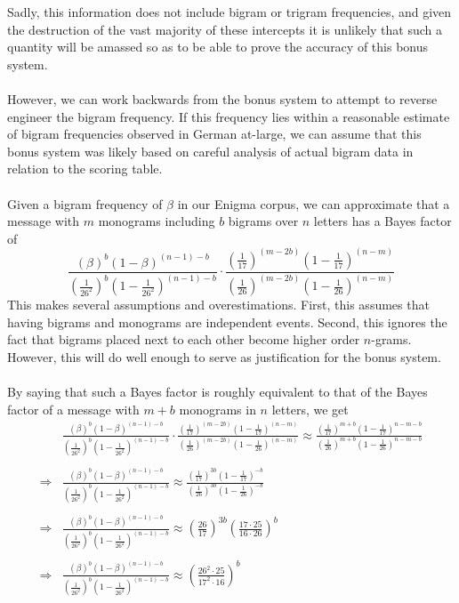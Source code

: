   Sadly, this information does not include bigram or trigram
  frequencies, and given the destruction of the vast majority of
  these intercepts it
  is unlikely that such a quantity will be amassed so as to be able
  to prove the accuracy of this bonus system.
  \\\\However, we can work backwards from the bonus system to attempt
  to reverse engineer the bigram frequency. If this frequency lies
  within a reasonable estimate of bigram frequencies observed in
  German at-large, we can assume that this bonus system was likely
  based on careful analysis of actual bigram data in relation to the
  scoring table.
  \\\\Given a bigram frequency of $\beta$ in our Enigma corpus, we
  can approximate that a message with $m$ monograms including $b$
  bigrams over $n$ letters has a Bayes factor of
  \[
    \frac{(\beta)^b(1-\beta)^{(n-1)-b}}{(\frac{1}{26^2})^b(1-\frac{1}{26^2})^{(n-1)-b}}\cdot\frac{(\frac{1}{17})^{(m-2b)}(1-\frac{1}{17})^{(n-m)}}{(\frac{1}{26})^{(m-2b)}(1-\frac{1}{26})^{(n-m)}}
  \]
  This makes several assumptions and overestimations. First, this
  assumes that having bigrams and monograms are independent events.
  Second, this ignores the fact that bigrams placed next to each
  other become higher order $n$-grams. However, this will do well
  enough to serve as justification for the bonus system.
  \\\\By saying that such a Bayes factor is roughly equivalent to
  that of the Bayes factor of a message with $m+b$ monograms in $n$
  letters, we get
  \begin{align*}
    &
    \frac{(\beta)^b(1-\beta)^{(n-1)-b}}{(\frac{1}{26^2})^b(1-\frac{1}{26^2})^{(n-1)-b}}\cdot\frac{(\frac{1}{17})^{(m-2b)}(1-\frac{1}{17})^{(n-m)}}{(\frac{1}{26})^{(m-2b)}(1-\frac{1}{26})^{(n-m)}}
    \approx
    \frac{(\frac{1}{17})^{m+b}(1-\frac{1}{17})^{n-m-b}}{(\frac{1}{26})^{m+b}(1-\frac{1}{26})^{n-m-b}}
    \\\\
    \Rightarrow &
    \frac{(\beta)^b(1-\beta)^{(n-1)-b}}{(\frac{1}{26^2})^b(1-\frac{1}{26^2})^{(n-1)-b}}\approx
    \frac{(\frac{1}{17})^{3b}(1-\frac{1}{17})^{-b}}{(\frac{1}{26})^{3b}(1-\frac{1}{26})^{-b}}
    \\\\
    \Rightarrow &
    \frac{(\beta)^b(1-\beta)^{(n-1)-b}}{(\frac{1}{26^2})^b(1-\frac{1}{26^2})^{(n-1)-b}}\approx
    (\frac{26}{17})^{3b}(\frac{17\cdot25}{16\cdot26})^b
    \\\\
    \Rightarrow &
    \frac{(\beta)^b(1-\beta)^{(n-1)-b}}{(\frac{1}{26^2})^b(1-\frac{1}{26^2})^{(n-1)-b}}\approx
    (\frac{26^2\cdot25}{17^2\cdot16})^b
  \end{align*}


